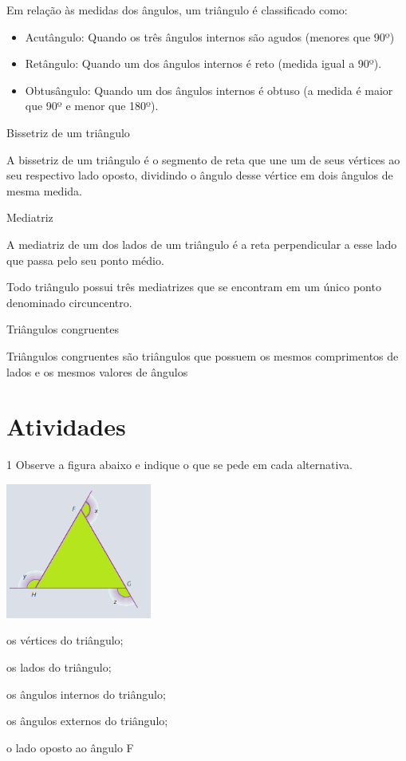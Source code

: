 {Em relação às medidas dos ângulos, um triângulo é classificado como:

\begin{itemize}
\item
  Acutângulo: Quando os três ângulos internos são agudos (menores que
  90º)
\item
  Retângulo: Quando um dos ângulos internos é reto (medida igual a 90º).
\item
  Obtusângulo: Quando um dos ângulos internos é obtuso (a medida é maior
  que 90º e menor que 180º).
\end{itemize}

Bissetriz de um triângulo

A bissetriz de um triângulo é o segmento de reta que une um de seus
vértices ao seu respectivo lado oposto, dividindo o ângulo desse vértice
em dois ângulos de mesma medida.

Mediatriz

A mediatriz de um dos lados de um triângulo é a reta perpendicular a
esse lado que passa pelo seu ponto médio.

Todo triângulo possui três mediatrizes que se encontram em um único
ponto denominado circuncentro.

Triângulos congruentes

Triângulos congruentes são triângulos que possuem os mesmos comprimentos
de lados e os mesmos valores de ângulos

\section{Atividades}

\num{1} Observe a figura abaixo e indique o que se pede em cada alternativa.

\includegraphics[width=1.88333in,height=1.75048in]{./imgSAEB_8_MAT/media/image13.png}
\item os vértices do triângulo;
\item os lados do triângulo;
\item os ângulos internos do triângulo;
\item os ângulos externos do triângulo;
\item o lado oposto ao ângulo F

}
